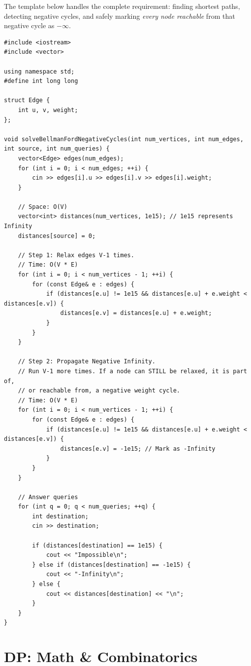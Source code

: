 The template below handles the complete requirement: finding shortest paths, detecting negative cycles, and safely marking \textit{every node reachable} from that negative cycle as $-\infty$.

\begin{lstlisting}
#include <iostream>
#include <vector>

using namespace std;
#define int long long

struct Edge {
    int u, v, weight;
};

void solveBellmanFordNegativeCycles(int num_vertices, int num_edges, int source, int num_queries) {
    vector<Edge> edges(num_edges);
    for (int i = 0; i < num_edges; ++i) {
        cin >> edges[i].u >> edges[i].v >> edges[i].weight;
    }
    
    // Space: O(V)
    vector<int> distances(num_vertices, 1e15); // 1e15 represents Infinity
    distances[source] = 0;
    
    // Step 1: Relax edges V-1 times. 
    // Time: O(V * E)
    for (int i = 0; i < num_vertices - 1; ++i) {
        for (const Edge& e : edges) {
            if (distances[e.u] != 1e15 && distances[e.u] + e.weight < distances[e.v]) {
                distances[e.v] = distances[e.u] + e.weight;
            }
        }
    }
    
    // Step 2: Propagate Negative Infinity.
    // Run V-1 more times. If a node can STILL be relaxed, it is part of, 
    // or reachable from, a negative weight cycle.
    // Time: O(V * E)
    for (int i = 0; i < num_vertices - 1; ++i) {
        for (const Edge& e : edges) {
            if (distances[e.u] != 1e15 && distances[e.u] + e.weight < distances[e.v]) {
                distances[e.v] = -1e15; // Mark as -Infinity
            }
        }
    }
    
    // Answer queries
    for (int q = 0; q < num_queries; ++q) {
        int destination;
        cin >> destination;
        
        if (distances[destination] == 1e15) {
            cout << "Impossible\n";
        } else if (distances[destination] == -1e15) {
            cout << "-Infinity\n";
        } else {
            cout << distances[destination] << "\n";
        }
    }
}
\end{lstlisting}




\section{DP: Math \& Combinatorics}


